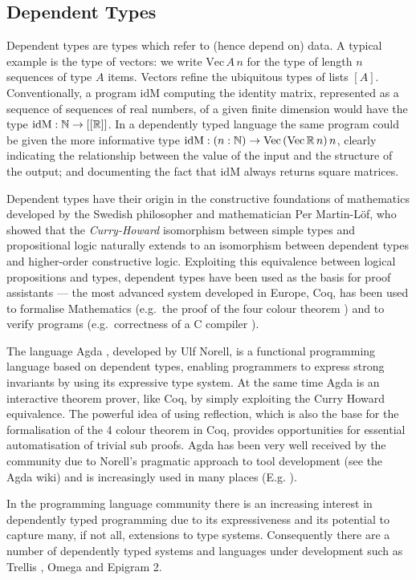 \documentclass[a4paper]{article}
\begin{document}
\subsection*{Dependent Types}
Dependent types are types which refer to (hence depend on)
data. A typical example is the type of vectors: we write
$\mathrm{Vec}\,A\,n$ for the type of length $n$ sequences of type $A$
items. Vectors refine the ubiquitous types of lists $[A]$.
Conventionally, a program $\mathrm{idM}$ computing the identity
matrix, represented as a sequence of sequences of real numbers, of a
given finite dimension would have the type $\mathrm{idM} : \Bbb{N} \to
[[\Bbb{R}]]$. In a dependently typed language the same program could
be given the more informative type $\mathrm{idM} : (n:\Bbb{N}) \to
\mathrm{Vec}\,(\mathrm{Vec}\,\Bbb{R}\,n)\,n$, clearly indicating the
relationship between the value of the input and the structure of the
output; and documenting the fact that $\mathrm{idM}$ always returns
square matrices.

Dependent types have their origin in the constructive foundations of
mathematics developed by the Swedish
philosopher and mathematician Per Martin-L\"of, who showed that the
\emph{Curry-Howard} isomorphism between simple types and propositional
logic naturally extends to an isomorphism between dependent types and
higher-order constructive logic.  Exploiting this equivalence between
logical propositions and types, dependent types have been used as the
basis for proof assistants --- the most advanced system developed in
Europe, Coq, has been used to formalise Mathematics (e.g.\
the proof of the four colour theorem
) and to verify programs (e.g.\
correctness of a C
compiler \citemain{compcert-back}).

The language Agda , developed by Ulf Norell, is a functional
programming language based on dependent types, enabling programmers to
express strong invariants by using its expressive type system. At the
same time Agda is an interactive theorem prover, like Coq, by simply
exploiting the Curry Howard equivalence. The powerful idea of using
reflection, which is also the base for the formalisation of the 4
colour theorem in Coq, provides opportunities for essential
automatisation of trivial sub proofs. Agda has been very well received
by the community due to Norell's pragmatic approach to tool
development (see the Agda wiki)
and is increasingly used in many places 
(E.g. \citemain{agda4}).

In the programming language community there is an increasing interest
in dependently typed programming due to its expressiveness and its
potential to capture many, if not all, extensions to type
systems. Consequently there are a number of dependently typed systems
and languages under development such as Trellis , Omega
\citemain{omega} and Epigram 2.
\end{document}
